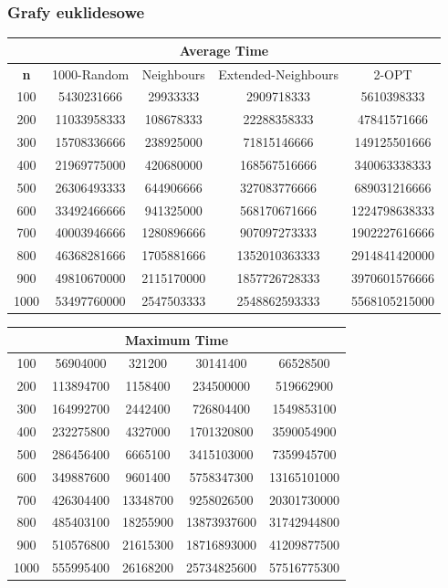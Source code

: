 \documentclass{article}
\begin{document}
\subsubsection{Grafy euklidesowe}

\begin{center}
\begin{tabular}{|c|c|c|c|c|}
\hline
\multicolumn{5}{|c|}{\textbf{Average Time}}\\
\hline
\textbf{n} & 1000-Random & Neighbours & Extended-Neighbours & 2-OPT\\
\hline
100 & 5430231666 & 29933333 & 2909718333 & 5610398333\\
\hline
200 & 11033958333 & 108678333 & 22288358333 & 47841571666\\
\hline
300 & 15708336666 & 238925000 & 71815146666 & 149125501666\\
\hline
400 & 21969775000 & 420680000 & 168567516666 & 340063338333\\
\hline
500 & 26306493333 & 644906666 & 327083776666 & 689031216666\\
\hline
600 & 33492466666 & 941325000 & 568170671666 & 1224798638333\\
\hline
700 & 40003946666 & 1280896666 & 907097273333 & 1902227616666\\
\hline
800 & 46368281666 & 1705881666 & 1352010363333 & 2914841420000\\
\hline
900 & 49810670000 & 2115170000 & 1857726728333 & 3970601576666\\
\hline
1000 & 53497760000 & 2547503333 & 2548862593333 & 5568105215000\\
\hline
\end{tabular}
\end{center}


\begin{center}
\begin{tabular}{|c|c|c|c|c|}
\hline
\multicolumn{5}{|c|}{\textbf{Maximum Time}}\\
\hline
100 & 56904000 & 321200 & 30141400 & 66528500\\
\hline
200 & 113894700 & 1158400 & 234500000 & 519662900\\
\hline
300 & 164992700 & 2442400 & 726804400 & 1549853100\\
\hline
400 & 232275800 & 4327000 & 1701320800 & 3590054900\\
\hline
500 & 286456400 & 6665100 & 3415103000 & 7359945700\\
\hline
600 & 349887600 & 9601400 & 5758347300 & 13165101000\\
\hline
700 & 426304400 & 13348700 & 9258026500 & 20301730000\\
\hline
800 & 485403100 & 18255900 & 13873937600 & 31742944800\\
\hline
900 & 510576800 & 21615300 & 18716893000 & 41209877500\\
\hline
1000 & 555995400 & 26168200 & 25734825600 & 57516775300\\
\hline
\end{tabular}
\end{center}
\end{document}
